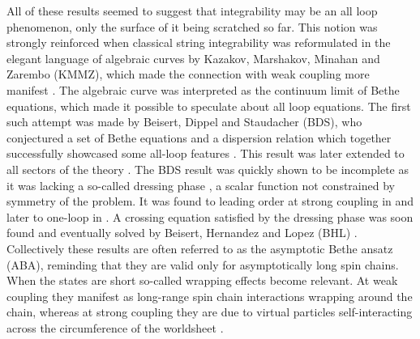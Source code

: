 All of these results seemed to suggest that integrability may be an all loop phenomenon, only the surface of it being scratched so far. 
This notion was strongly reinforced when classical string integrability was reformulated in the elegant language of algebraic curves by Kazakov, Marshakov, Minahan and Zarembo (KMMZ), which made the connection with weak coupling more manifest \cite{Kazakov:2004qf}. 
The algebraic curve was interpreted as the continuum limit of Bethe equations, which made it possible to speculate about all loop equations.
The first such attempt was made by Beisert, Dippel and Staudacher (BDS), who conjectured a set of Bethe equations and a dispersion relation which together successfully showcased some all-loop features \cite{Beisert:2004hm}.
This result was later extended to all sectors of the theory \cite{Beisert:2005fw}.
The BDS result was quickly shown to be incomplete as it was lacking a so-called dressing phase \cite{Arutyunov:2004vx}, a scalar function not constrained by symmetry of the problem.
It was found to leading order at strong coupling in \cite{Arutyunov:2004vx} and later to one-loop in \cite{Hernandez:2006tk}.
A crossing equation satisfied by the dressing phase was soon found \cite{Janik:2006dc} and eventually solved by Beisert, Hernandez and Lopez (BHL) \cite{Beisert:2006ib}.  
Collectively these results are often referred to as the asymptotic Bethe ansatz (ABA), reminding that they are valid only for asymptotically long spin chains. 
When the states are short so-called wrapping effects become relevant. 
At weak coupling they manifest as long-range spin chain interactions wrapping around the chain, whereas at strong coupling they are due to virtual particles self-interacting across the circumference of the worldsheet \cite{Sieg:2005kd, Ambjorn:2005wa}.

\vspace{20pt}
\vspace{20pt}

